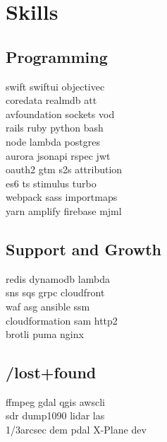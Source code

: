 \documentclass[]{plushcv}
\begin{document}
\hfill
\begin{minipage}[t]{0.25\textwidth} 


\section{Skills}
\subsection{Programming}
\sectionsep
{}
swift \textbullet{} swiftui \textbullet{} objectivec  \\ 
coredata \textbullet{} realmdb \textbullet{} att \\
avfoundation \textbullet{} sockets \textbullet{} vod \\
\sectionsep
{}
rails \textbullet{} ruby \textbullet{} python \textbullet{} bash \\
node \textbullet{} lambda \textbullet{} postgres   \\
aurora \textbullet{} jsonapi \textbullet{} rspec \textbullet{} jwt \\
oauth2 \textbullet{} gtm \textbullet{} s2s attribution \\
\sectionsep
{}
es6 \textbullet{} ts \textbullet{} stimulus \textbullet{} turbo \\
webpack \textbullet{} sass \textbullet{} importmaps \\
yarn \textbullet{} amplify \textbullet{} firebase \textbullet{} mjml \\
\sectionsep
\sectionsep
\subsection{Support and Growth}
\sectionsep
redis \textbullet{} dynamodb \textbullet{} lambda \\
sns \textbullet{} sqs \textbullet{} grpc \textbullet{} cloudfront \\
waf \textbullet{} asg \textbullet{} ansible \textbullet{} ssm \\
cloudformation \textbullet{} sam \textbullet{} http2 \\
brotli \textbullet{} puma \textbullet{} nginx \\


\sectionsep
\sectionsep
\subsection{/lost+found}
\sectionsep
ffmpeg \textbullet{} gdal \textbullet{} qgis \textbullet{} awscli  \\
sdr \textbullet{} dump1090 \textbullet{} lidar las \\
1/3arcsec dem \textbullet{} pdal \textbullet{} X-Plane dev \\



\end{minipage}
\end{document}
